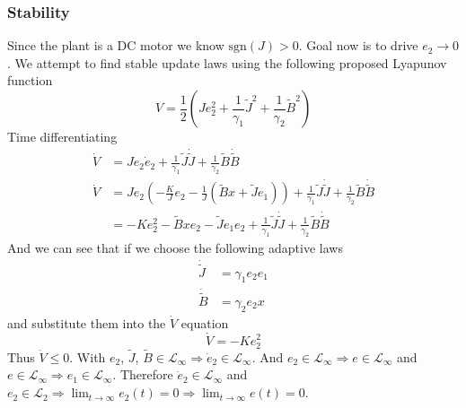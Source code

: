 \begin{figure}[H]
  \begin{center}
  \end{center}
\end{figure}

\subsubsection{Stability}

Since the plant is a DC motor we know $\text{sgn}(J)>0$.
Goal now is to drive $e_{2}\rightarrow0$.
We attempt to find stable update laws using the following proposed Lyapunov function
\begin{equation*}
  V=\frac{1}{2}\left(Je_{2}^{2}+\frac{1}{\gamma_{1}}\tilde{J}^{2}+\frac{1}{\gamma_{2}}\tilde{B}^{2}\right)
\end{equation*}
Time differentiating
\begin{align*}
  \dot{V}&=Je_{2}\dot{e}_{2}+\frac{1}{\gamma_{1}}\tilde{J}\dot{\tilde{J}}+\frac{1}{\gamma_{2}}\tilde{B}\dot{\tilde{B}} \\
  \dot{V}&=Je_{2}\left(-\frac{K}{J}e_{2}-\frac{1}{J}\left(\tilde{B}x+\tilde{J}e_{1}\right)\right)+\frac{1}{\gamma_{1}}\tilde{J}\dot{\tilde{J}}+\frac{1}{\gamma_{2}}\tilde{B}\dot{\tilde{B}} \\
  &=-Ke_{2}^{2}-\tilde{B}xe_{2}-\tilde{J}e_{1}e_{2}+\frac{1}{\gamma_{1}}\tilde{J}\dot{\tilde{J}}+\frac{1}{\gamma_{2}}\tilde{B}\dot{\tilde{B}}
\end{align*}
And we can see that if we choose the following adaptive laws
\begin{align*}
  \dot{\tilde{J}}&=\gamma_{1}e_{2}e_{1} \\
  \dot{\tilde{B}}&=\gamma_{2}e_{2}x
\end{align*}
and substitute them into the $\dot{V}$ equation
\begin{equation*}
  \dot{V}=-Ke_{2}^{2}
\end{equation*}
Thus $\dot{V}\leq0$.
With $e_{2}$, $\tilde{J}$, $\tilde{B}\in\mathcal{L}_{\infty} \Rightarrow \dot{e}_{2} \in\mathcal{L}_{\infty}$.
And $e_{2}\in\mathcal{L}_{\infty} \Rightarrow e\in\mathcal{L}_{\infty}$ and $e\in\mathcal{L}_{\infty} \Rightarrow e_{1}\in\mathcal{L}_{\infty}$.
Therefore $\dot e_{2} \in\mathcal{L}_{\infty}$ and $e_{2}\in\mathcal{L}_{2} \Rightarrow \lim_{t\rightarrow\infty} e_{2}(t)=0 \Rightarrow \lim_{t\rightarrow\infty} e(t)=0$.

